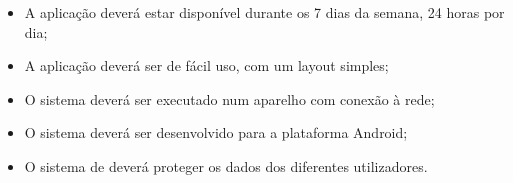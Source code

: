 \begin{itemize}
    \item A aplicação deverá estar disponível durante os 7 dias da semana, 24 horas por dia;
    \item A aplicação deverá ser de fácil uso, com um layout simples;
    \item O sistema deverá ser executado num aparelho com conexão à rede;
    \item O sistema deverá ser desenvolvido para a plataforma Android;
    \item O sistema de deverá proteger os dados dos diferentes utilizadores.
\end{itemize}